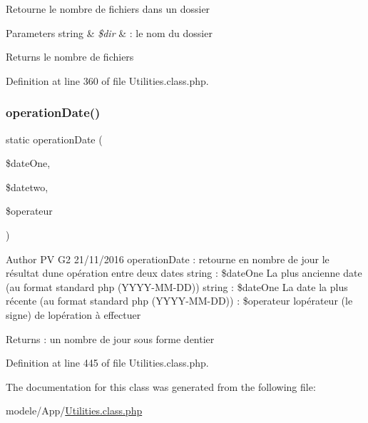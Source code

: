 Retourne le nombre de fichiers dans un dossier 
\begin{DoxyParams}[1]{Parameters}
string & {\em \$dir} & \+: le nom du dossier \\
\hline
\end{DoxyParams}
\begin{DoxyReturn}{Returns}
le nombre de fichiers 
\end{DoxyReturn}


Definition at line 360 of file Utilities.\+class.\+php.

\mbox{\label{class_utilities_afdefc03981b517dfe3bf6c9f788b4c8d}} 
\subsubsection{\texorpdfstring{operation\+Date()}{operationDate()}}
{\footnotesize\ttfamily static operation\+Date (\begin{DoxyParamCaption}\item[{}]{\$date\+One,  }\item[{}]{\$datetwo,  }\item[{}]{\$operateur }\end{DoxyParamCaption})\hspace{0.3cm}{\ttfamily [static]}}

\begin{DoxyAuthor}{Author}
PV G2 21/11/2016 operation\+Date \+: retourne en nombre de jour le résultat d\textquotesingle{}une opération entre deux dates  string \+: \$date\+One La plus ancienne date (au format standard php (Y\+Y\+Y\+Y-\/\+M\+M-\/\+DD))  string \+: \$date\+One La date la plus récente (au format standard php (Y\+Y\+Y\+Y-\/\+M\+M-\/\+DD))  \+: \$operateur l\textquotesingle{}opérateur (le signe) de l\textquotesingle{}opération à effectuer 
\end{DoxyAuthor}
\begin{DoxyReturn}{Returns}
\+: un nombre de jour sous forme d\textquotesingle{}entier 
\end{DoxyReturn}


Definition at line 445 of file Utilities.\+class.\+php.



The documentation for this class was generated from the following file\+:\begin{DoxyCompactItemize}
\item 
modele/\+App/\hyperlink{_utilities_8class_8php}{Utilities.\+class.\+php}\end{DoxyCompactItemize}
